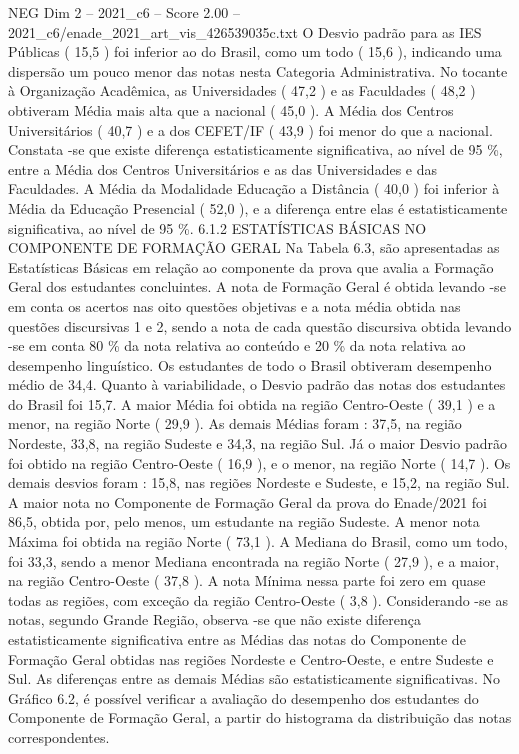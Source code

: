 \begin{textsample}{NEG Dim 2 – 2021\_c6 – Score 2.00 – 2021\_c6/enade\_2021\_art\_vis\_426539035c.txt}
O Desvio padrão para as IES Públicas ( 15,5 ) foi inferior ao do Brasil, como um todo ( 15,6 ), indicando uma dispersão um pouco menor das notas nesta Categoria Administrativa.
No tocante à Organização Acadêmica, as Universidades ( 47,2 ) e as Faculdades ( 48,2 ) obtiveram Média mais alta que a nacional ( 45,0 ).
A Média dos Centros Universitários ( 40,7 ) e a dos CEFET/IF ( 43,9 ) foi menor do que a nacional.
Constata -se que existe diferença estatisticamente significativa, ao nível de 95 \%, entre a Média dos Centros Universitários e as das Universidades e das Faculdades.
A Média da Modalidade Educação a Distância ( 40,0 ) foi inferior à Média da Educação Presencial ( 52,0 ), e a diferença entre elas é estatisticamente significativa, ao nível de 95 \%. 6.1.2 ESTATÍSTICAS BÁSICAS NO COMPONENTE DE FORMAÇÃO GERAL Na Tabela 6.3, são apresentadas as Estatísticas Básicas em relação ao componente da prova que avalia a Formação Geral dos estudantes concluintes.
A nota de Formação Geral é obtida levando -se em conta os acertos nas oito questões objetivas e a nota média obtida nas questões discursivas 1 e 2, sendo a nota de cada questão discursiva obtida levando -se em conta 80 \% da nota relativa ao conteúdo e 20 \% da nota relativa ao desempenho linguístico.
Os estudantes de todo o Brasil obtiveram desempenho médio de 34,4.
Quanto à variabilidade, o Desvio padrão das notas dos estudantes do Brasil foi 15,7.
A maior Média foi obtida na região Centro-Oeste ( 39,1 ) e a menor, na região Norte ( 29,9 ).
As demais Médias foram : 37,5, na região Nordeste, 33,8, na região Sudeste e 34,3, na região Sul.
Já o maior Desvio padrão foi obtido na região Centro-Oeste ( 16,9 ), e o menor, na região Norte ( 14,7 ).
Os demais desvios foram : 15,8, nas regiões Nordeste e Sudeste, e 15,2, na região Sul.
A maior nota no Componente de Formação Geral da prova do Enade/2021 foi 86,5, obtida por, pelo menos, um estudante na região Sudeste.
A menor nota Máxima foi obtida na região Norte ( 73,1 ).
A Mediana do Brasil, como um todo, foi 33,3, sendo a menor Mediana encontrada na região Norte ( 27,9 ), e a maior, na região Centro-Oeste ( 37,8 ).
A nota Mínima nessa parte foi zero em quase todas as regiões, com exceção da região Centro-Oeste ( 3,8 ).
Considerando -se as notas, segundo Grande Região, observa -se que não existe diferença estatisticamente significativa entre as Médias das notas do Componente de Formação Geral obtidas nas regiões Nordeste e Centro-Oeste, e entre Sudeste e Sul.
As diferenças entre as demais Médias são estatisticamente significativas.
No Gráfico 6.2, é possível verificar a avaliação do desempenho dos estudantes do Componente de Formação Geral, a partir do histograma da distribuição das notas correspondentes.

\end{textsample}
